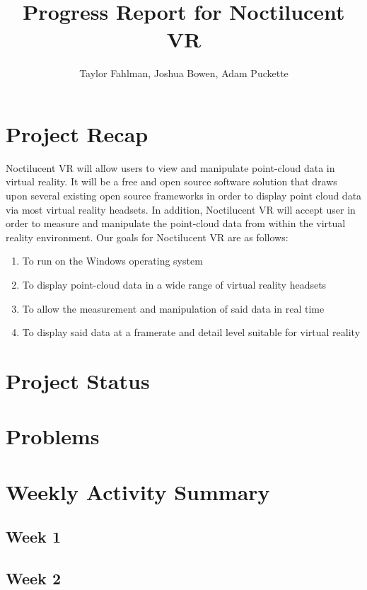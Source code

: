 \documentclass{article}
\begin{document}
\title {Progress Report for Noctilucent VR}
\author {Taylor Fahlman, Joshua Bowen, Adam Puckette}

\maketitle

\section{Project Recap}

Noctilucent VR will allow users to view and manipulate point-cloud data in virtual reality. 
It will be a free and open source software solution that draws upon several existing open source frameworks in order to display point cloud data via most virtual reality headsets. 
In addition, Noctilucent VR will accept user in order to measure and manipulate the point-cloud data from within the virtual reality environment. 
Our goals for Noctilucent VR are as follows:

\begin{enumerate}
\item To run on the Windows operating system
\item To display point-cloud data in a wide range of virtual reality headsets
\item To allow the measurement and manipulation of said data in real time
\item To display said data at a framerate and detail level suitable for virtual reality
\end{enumerate}

\section{Project Status}

\section{Problems}

\section{Weekly Activity Summary}
\subsection{Week 1}

\subsection{Week 2}
\end{document}
